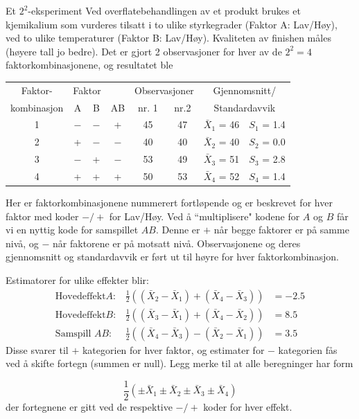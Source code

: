 \begin{eksempel}{Et $2^2$-eksperiment}
Ved overflatebehandlingen av et produkt brukes et kjemikalium som 
vurderes tilsatt i to ulike styrkegrader (Faktor A: Lav/Høy), 
ved to ulike temperaturer (Faktor B: Lav/Høy).
Kvaliteten av finishen måles (høyere tall jo bedre). Det er gjort 2
observasjoner for hver av de $2^2 = 4$ faktorkombinasjonene, og resultatet ble
\begin{center}
\begin{tabular}{|c|cc|c|cc|cc|} \hline
Faktor-     & \multicolumn{2}{c}{Faktor}& &\multicolumn{2}{c|}{Observasjoner}
               &\multicolumn{2}{c|}{Gjennomsnitt/}   \\
kombinasjon & A & B  & AB  & nr. 1  &  nr.2  & 
                                \multicolumn{2}{c|}{Standardavvik}\\ \hline
   1   &$-$&$-$ &  +  &  45    &   47   &  $\bar{X}_1$ = 46  &  $S_1$ = 1.4\\
   2   & + &$-$ & $-$ &  40    &   40   &  $\bar{X}_2$ = 40  &  $S_2$ = 0.0 \\
   3   &$-$& +  & $-$ &  53    &   49   &  $\bar{X}_3$ = 51  &  $S_3$ = 2.8\\
   4   & + & +  &  +  &  50    &   53   &  $\bar{X}_4$ = 52  &  $S_4$ = 1.4\\ \hline
\end{tabular}
\end{center}
Her er faktorkombinasjonene nummerert fortløpende og er beskrevet for
hver faktor med koder $-/+$ for Lav/Høy.  Ved å ``multiplisere"
kodene for $A$ og $B$ får vi en nyttig kode for samspillet $AB$.
Denne er $+$ når begge faktorer er på samme nivå, og $-$
når faktorene er på motsatt nivå.  Observasjonene og deres
gjennomsnitt og standardavvik er ført ut til høyre for hver 
faktorkombinasjon.

Estimatorer for ulike effekter blir:
\begin{eqnarray*}
\mbox{Hovedeffekt} A:&\frac{1}{2}((\bar{X}_2-\bar{X}_1)+(\bar{X}_4-\bar{X}_3))&=-2.5\\
\mbox{Hovedeffekt} B:&\frac{1}{2}((\bar{X}_3-\bar{X}_1)+(\bar{X}_4-\bar{X}_2))&=8.5\\
\mbox{Samspill\ \ }AB:&\frac{1}{2}((\bar{X}_4-\bar{X}_3)-(\bar{X}_2-\bar{X}_1))&=3.5
\end{eqnarray*}
Disse svarer til $+$ kategorien for hver faktor, og estimater for $-$
kategorien fås ved å skifte fortegn (summen er null).  Legg
merke til at alle beregninger har form

\[ \frac{1}{2}(\pm \bar{X}_1 \pm \bar{X}_2 \pm \bar{X}_3 \pm \bar{X}_4) \]
der fortegnene er gitt ved de respektive $-/+$ koder for hver effekt.


\end{eksempel}
